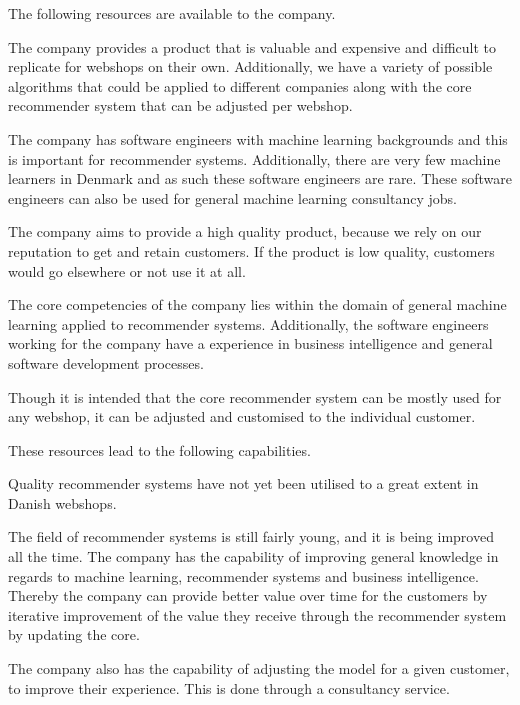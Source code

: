 The following resources are available to the company.
\begin{description}[style=nextline]
\item[Software Product]
The company provides a product that is valuable and expensive and difficult to replicate for webshops on their own. 
Additionally, we have a variety of possible algorithms that could be applied to different companies along with the core recommender system that can be adjusted per webshop.
\item[People \& Talent]
The company has software engineers with machine learning backgrounds and this is important for recommender systems. 
Additionally, there are very few machine learners in Denmark and as such these software engineers are rare. 
These software engineers can also be used for general machine learning consultancy jobs.
\item[Core Values]
The company aims to provide a high quality product, because we rely on our reputation to get and retain customers. 
If the product is low quality, customers would go elsewhere or not use it at all. 
\item[Knowledge]
The core competencies of the company lies within the domain of general machine learning applied to recommender systems. 
Additionally, the software engineers working for the company have a experience in business intelligence and general software development processes.
\item[Increased Capabilities]
Though it is intended that the core recommender system can be mostly used for any webshop, it can be adjusted and customised to the individual customer.
\end{description}

These resources lead to the following capabilities.
\begin{description}[style=nextline]
\item[Provide quality recommender systems]
Quality recommender systems have not yet been utilised to a great extent in Danish webshops.
\item[Improvement of knowledge base]
The field of recommender systems is still fairly young, and it is being improved all the time. 
The company has the capability of improving general knowledge in regards to machine learning, recommender systems and business intelligence. 
Thereby the company can provide better value over time for the customers by iterative improvement of the value they receive through the recommender system by updating the core.
\item[Response to Customer Needs]
The company also has the capability of adjusting the model for a given customer, to improve their experience. This is done through a consultancy service.
\end{description}

